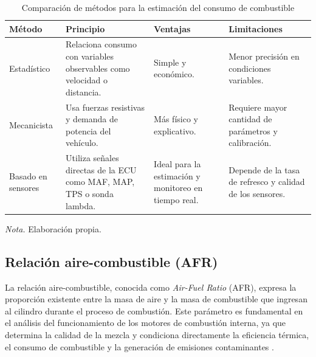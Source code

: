 \begin{table}[h]
	\centering
	\captionsetup{labelformat=simple, labelsep=newline, textfont=it, labelfont=bf}
	\caption{Comparación de métodos para la estimación del consumo de combustible}
	\label{tab:estim}
	\vspace{0.3cm}
	
	\begin{tabularx}{\linewidth}{p{2.5cm} X X X}
		\toprule %
		\rowcolor[rgb]{0.851, 0.851, 0.851}
		\textbf{Método} & \textbf{Principio} & \textbf{Ventajas} & \textbf{Limitaciones} \\
		\midrule %
		Estadístico & Relaciona consumo con variables observables como velocidad o distancia. & Simple y económico. & Menor precisión en condiciones variables. \\
		\addlinespace
		Mecanicista & Usa fuerzas resistivas y demanda de potencia del vehículo. & Más físico y explicativo. & Requiere mayor cantidad de parámetros y calibración. \\
		\addlinespace
		Basado en sensores & Utiliza señales directas de la ECU como MAF, MAP, TPS o sonda lambda. & Ideal para la estimación y monitoreo en tiempo real. & Depende de la tasa de refresco y calidad de los sensores. \\
		\bottomrule %
	\end{tabularx}
	\vspace{0.2cm}
	
	\begin{flushleft}
		\footnotesize \textit{Nota.} Elaboración propia.
	\end{flushleft}
\end{table}

\subsection{Relación aire-combustible (AFR)}

La relación aire-combustible, conocida como \textit{Air-Fuel Ratio} (AFR), expresa la proporción existente entre la masa de aire y la masa de combustible que ingresan al cilindro durante el proceso de combustión. Este parámetro es fundamental en el análisis del funcionamiento de los motores de combustión interna, ya que determina la calidad de la mezcla y condiciona directamente la eficiencia térmica, el consumo de combustible y la generación de emisiones contaminantes \citep{AFRLambdaHPAcademy, AFRAnsed}.


